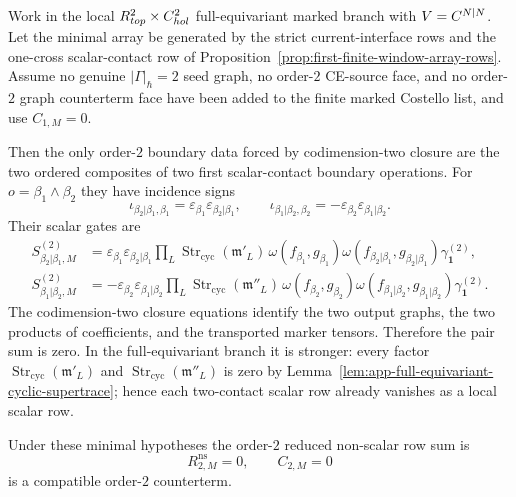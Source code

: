 \begin{prop}\label{prop:order-two-finite-window-boundary-rows}
  Work in the local
  \(R^2_{top}\times C^2_{hol}\) full-equivariant marked
  branch with \(V=C^{N|N}\).  Let the minimal array be generated by the
  strict current-interface rows and the one-cross scalar-contact row of
  Proposition~\ref{prop:first-finite-window-array-rows}.  Assume no genuine
  \(|\Gamma|_\hbar=2\) seed graph, no order-\(2\) CE-source face, and no
  order-\(2\) graph counterterm face have been added to the finite marked
  Costello list, and use \(C_{1,M}=0\).

  Then the only order-\(2\) boundary data forced by codimension-two closure
  are the two ordered composites of two first scalar-contact boundary
  operations.  For
  \(o=\beta_1\wedge\beta_2\) they have incidence signs
  \[
    \iota_{\beta_2|\beta_1,\beta_1}
      =
    \varepsilon_{\beta_1}\varepsilon_{\beta_2|\beta_1},
    \qquad
    \iota_{\beta_1|\beta_2,\beta_2}
      =
    -\varepsilon_{\beta_2}\varepsilon_{\beta_1|\beta_2}.
  \]
  Their scalar gates are
  \[
  \begin{aligned}
    S^{(2)}_{\beta_2|\beta_1,M}
      &=
      \varepsilon_{\beta_1}\varepsilon_{\beta_2|\beta_1}
      \prod_L\operatorname{Str}_{\mathrm{cyc}}(\mathfrak m'_L)\,
      \omega(f_{\beta_1},g_{\beta_1})
      \omega(f_{\beta_2|\beta_1},g_{\beta_2|\beta_1})
      \gamma_{\mathbf 1}^{(2)},\\
    S^{(2)}_{\beta_1|\beta_2,M}
      &=
      -\varepsilon_{\beta_2}\varepsilon_{\beta_1|\beta_2}
      \prod_L\operatorname{Str}_{\mathrm{cyc}}(\mathfrak m''_L)\,
      \omega(f_{\beta_2},g_{\beta_2})
      \omega(f_{\beta_1|\beta_2},g_{\beta_1|\beta_2})
      \gamma_{\mathbf 1}^{(2)}.
  \end{aligned}
  \]
  The codimension-two closure equations identify the two output graphs,
  the two products of coefficients, and the transported marker tensors.
  Therefore the pair sum is zero.  In the full-equivariant branch it is
  stronger: every factor
  \(\operatorname{Str}_{\mathrm{cyc}}(\mathfrak m'_L)\) and
  \(\operatorname{Str}_{\mathrm{cyc}}(\mathfrak m''_L)\) is zero by
  Lemma~\ref{lem:app-full-equivariant-cyclic-supertrace}; hence each
  two-contact scalar row already vanishes as a local scalar row.

  Under these minimal hypotheses the order-\(2\) reduced non-scalar row sum
  is
  \[
    R^{\mathrm{ns}}_{2,M}=0,
    \qquad
    C_{2,M}=0
  \]
  is a compatible order-\(2\) counterterm.


\end{prop}
